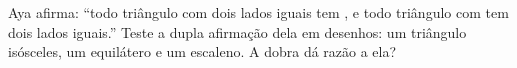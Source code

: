 \begin{exercise}[$\star\star$]\label{exo:g4:symmetry:11}
Aya afirma: ``todo triângulo com dois lados iguais tem , e todo triângulo com  tem dois lados
iguais.'' Teste a dupla afirmação dela em desenhos: um triângulo
isósceles, um equilátero e um escaleno. A dobra dá razão a ela?
\end{exercise}
